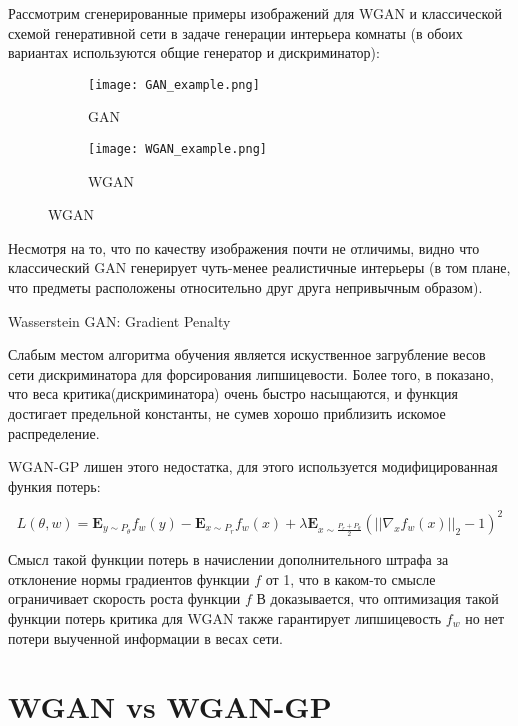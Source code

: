 \documentclass{article}
\begin{document}
Рассмотрим сгенерированные примеры изображений для WGAN и классической схемой генеративной сети в задаче генерации интерьера комнаты (в обоих вариантах используются общие генератор и дискриминатор):




\begin{figure}[h]
\centering
\begin{subfigure}{.5\textwidth}

  \texttt{[image: GAN\_example.png]}
  \caption{GAN}
\end{subfigure}%
\begin{subfigure}{.5\textwidth}
\centering
  \texttt{[image: WGAN\_example.png]}
  \caption{WGAN}
  \label{fig:sub2}
\end{subfigure}
\end{figure}

Несмотря на то, что по качеству изображения почти не отличимы, видно что классический GAN генерирует чуть-менее реалистичные интерьеры (в том плане, что предметы расположены относительно друг друга непривычным образом).

\caption{Wasserstein GAN: Gradient Penalty}

Слабым местом алгоритма обучения является искуственное загрубление весов сети дискриминатора для форсирования липшицевости. Более того, в \cite{wgan-improvement} показано, что веса критика(дискриминатора) очень быстро насыщаются, и функция достигает предельной константы, не сумев хорошо приблизить искомое распределение.

WGAN-GP лишен этого недостатка, для этого используется модифицированная функия потерь:

$$ L(\theta, w) = \mathbf{E}_{y\sim P_{\theta}}f_w(y) - \mathbf{E}_{x\sim P_r}f_w(x) + \lambda \mathbf{E}_{x \sim \frac{P_r+P_\theta}{2}} (||\nabla_x f_w(x)||_2 - 1)^2$$ 

Смысл такой функции потерь в начислении дополнительного штрафа за отклонение нормы градиентов функции $f$ от 1, что в каком-то смысле ограничивает скорость роста функции $f$
В \cite{wgan-improvement} доказывается, что оптимизация такой функции потерь критика для WGAN также гарантирует липшицевость $f_w$ но нет потери выученной информации в весах сети.

\newpage


\section{WGAN vs WGAN-GP}
\end{document}
